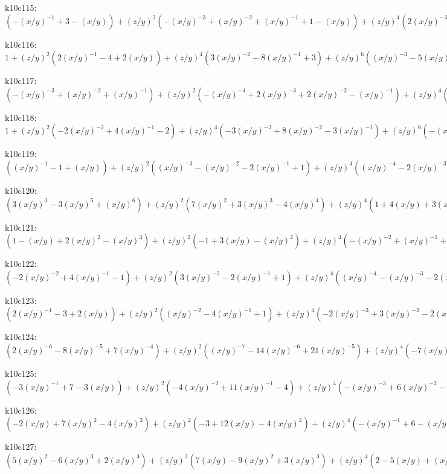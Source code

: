 k10c115: $ (-(x/y)^{-1}+3-(x/y))  +(z/y)^{2}(-(x/y)^{-3}+(x/y)^{-2}+(x/y)^{-1}+1-(x/y))  +(z/y)^{4}(2(x/y)^{-3}-(x/y)^{-2}+2(x/y)^{-1})  -(x/y)^{-3}(z/y)^{6} $ 

k10c116: $ 1  +(z/y)^{2}(2(x/y)^{-1}-4+2(x/y))  +(z/y)^{4}(3(x/y)^{-2}-8(x/y)^{-1}+3)  +(z/y)^{6}((x/y)^{-3}-5(x/y)^{-2}+(x/y)^{-1})  -(x/y)^{-3}(z/y)^{8} $ 

k10c117: $ (-(x/y)^{-3}+(x/y)^{-2}+(x/y)^{-1})  +(z/y)^{2}(-(x/y)^{-4}+2(x/y)^{-3}+2(x/y)^{-2}-(x/y)^{-1})  +(z/y)^{4}(-(x/y)^{-5}+2(x/y)^{-4}+2(x/y)^{-3}-(x/y)^{-2})  +(z/y)^{6}((x/y)^{-5}+(x/y)^{-4}) $ 

k10c118: $ 1  +(z/y)^{2}(-2(x/y)^{-2}+4(x/y)^{-1}-2)  +(z/y)^{4}(-3(x/y)^{-3}+8(x/y)^{-2}-3(x/y)^{-1})  +(z/y)^{6}(-(x/y)^{-4}+5(x/y)^{-3}-(x/y)^{-2})  +(x/y)^{-4}(z/y)^{8} $ 

k10c119: $ ((x/y)^{-1}-1+(x/y))  +(z/y)^{2}((x/y)^{-3}-(x/y)^{-2}-2(x/y)^{-1}+1)  +(z/y)^{4}((x/y)^{-4}-2(x/y)^{-3}-2(x/y)^{-2}+(x/y)^{-1})  +(z/y)^{6}(-(x/y)^{-4}-(x/y)^{-3}) $ 

k10c120: $ (3(x/y)^{3}-3(x/y)^{5}+(x/y)^{6})  +(z/y)^{2}(7(x/y)^{2}+3(x/y)^{3}-4(x/y)^{4})  +(z/y)^{4}(1+4(x/y)+3(x/y)^{2}) $ 

k10c121: $ (1-(x/y)+2(x/y)^{2}-(x/y)^{3})  +(z/y)^{2}(-1+3(x/y)-(x/y)^{2})  +(z/y)^{4}(-(x/y)^{-2}+(x/y)^{-1}+2-(x/y))  +(z/y)^{6}((x/y)^{-2}+(x/y)^{-1}) $ 

k10c122: $ (-2(x/y)^{-2}+4(x/y)^{-1}-1)  +(z/y)^{2}(3(x/y)^{-2}-2(x/y)^{-1}+1)  +(z/y)^{4}((x/y)^{-4}-(x/y)^{-3}-2(x/y)^{-2}+(x/y)^{-1})  +(z/y)^{6}(-(x/y)^{-4}-(x/y)^{-3}) $ 

k10c123: $ (2(x/y)^{-1}-3+2(x/y))  +(z/y)^{2}((x/y)^{-2}-4(x/y)^{-1}+1)  +(z/y)^{4}(-2(x/y)^{-3}+3(x/y)^{-2}-2(x/y)^{-1})  +(z/y)^{6}(-(x/y)^{-4}+4(x/y)^{-3}-(x/y)^{-2})  +(x/y)^{-4}(z/y)^{8} $ 

k10c124: $ (2(x/y)^{-6}-8(x/y)^{-5}+7(x/y)^{-4})  +(z/y)^{2}((x/y)^{-7}-14(x/y)^{-6}+21(x/y)^{-5})  +(z/y)^{4}(-7(x/y)^{-7}+21(x/y)^{-6})  +(z/y)^{6}(-(x/y)^{-8}+8(x/y)^{-7})  +(x/y)^{-8}(z/y)^{8} $ 

k10c125: $ (-3(x/y)^{-1}+7-3(x/y))  +(z/y)^{2}(-4(x/y)^{-2}+11(x/y)^{-1}-4)  +(z/y)^{4}(-(x/y)^{-3}+6(x/y)^{-2}-(x/y)^{-1})  +(x/y)^{-3}(z/y)^{6} $ 

k10c126: $ (-2(x/y)+7(x/y)^{2}-4(x/y)^{3})  +(z/y)^{2}(-3+12(x/y)-4(x/y)^{2})  +(z/y)^{4}(-(x/y)^{-1}+6-(x/y))  +(x/y)^{-1}(z/y)^{6} $ 

k10c127: $ (5(x/y)^{2}-6(x/y)^{3}+2(x/y)^{4})  +(z/y)^{2}(7(x/y)-9(x/y)^{2}+3(x/y)^{3})  +(z/y)^{4}(2-5(x/y)+(x/y)^{2})  -(z/y)^{6} $ 

